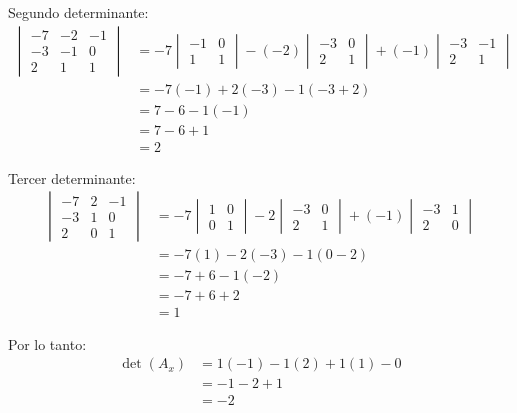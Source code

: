 \documentclass{article}
\begin{document}
Segundo determinante:
\begin{align}
    \begin{vmatrix} -7 & -2 & -1 \\ -3 & -1 & 0 \\ 2 & 1 & 1 \end{vmatrix} &= -7 \begin{vmatrix} -1 & 0 \\ 1 & 1 \end{vmatrix} - (-2) \begin{vmatrix} -3 & 0 \\ 2 & 1 \end{vmatrix} + (-1) \begin{vmatrix} -3 & -1 \\ 2 & 1 \end{vmatrix} \\
    &= -7(-1) + 2(-3) - 1(-3 + 2) \\
    &= 7 - 6 - 1(-1) \\
    &= 7 - 6 + 1 \\
    &= 2
\end{align}

Tercer determinante:
\begin{align}
    \begin{vmatrix} -7 & 2 & -1 \\ -3 & 1 & 0 \\ 2 & 0 & 1 \end{vmatrix} &= -7 \begin{vmatrix} 1 & 0 \\ 0 & 1 \end{vmatrix} - 2 \begin{vmatrix} -3 & 0 \\ 2 & 1 \end{vmatrix} + (-1) \begin{vmatrix} -3 & 1 \\ 2 & 0 \end{vmatrix} \\
    &= -7(1) - 2(-3) - 1(0 - 2) \\
    &= -7 + 6 - 1(-2) \\
    &= -7 + 6 + 2 \\
    &= 1
\end{align}

Por lo tanto:
\begin{align}
    \det(A_x) &= 1(-1) - 1(2) + 1(1) - 0 \\
    &= -1 - 2 + 1 \\
    &= -2
\end{align}
\end{document}
